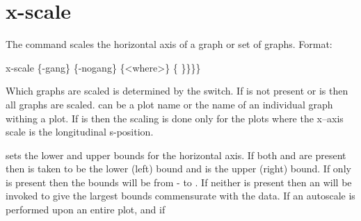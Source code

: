 {{{{%
\section{x-scale}
\label{s:x.scale}

The  command scales the horizontal axis of a graph or set of graphs.
Format:
\begin{example}
  x-scale \{-gang\} \{-nogang\} \{<where>\} \{<value1> \}<value2>\}\}\}
\end{example}

Which graphs are scaled is determined by the  switch. If
 is not present or  is \vn{*} then all
graphs are scaled.  can be a plot name or the name of an
individual graph withing a plot.  If  is  then the
scaling is done only for the plots where the x--axis scale is the
longitudinal s-position.

\vskip 0.2in  sets the lower and upper bounds for the
horizontal axis.  If both  and  are present
then  is taken to be the lower (left) bound and
 is the upper (right) bound. If only  is
present then the bounds will be from - to .
If neither is present then an  will be invoked to give
the largest bounds commensurate with the data. If an autoscale is
performed upon an entire plot, and if \vn{plot%
(\sref{s:template}) is True, then the chosen scales will be the same
for all graphs. That is, a single scale is calculated so that all the
data of all the graphs is within the plot region. The affect of
\vn{plot%
or \vn{-nogang} switches.

Note: The \vn{x-scale} command will vary the number of major divisions
(set by plot%
nice looking axis. The result can be that if two plots have the same
range of data but differing major division settings, the \vn{x-scale}
command can produce differing results.

Example:
\begin{example}
  x-scale                 ! Autoscale all x-axes.
  x-scale * 0 100         ! Scale all x-axes to go from 0 to 100.
\end{example}

}}}}}}
